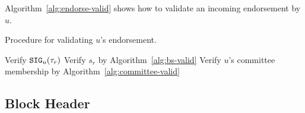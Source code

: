 \documentclass{article}
\begin{document}

Algorithm~\ref{alg:endorse-valid} shows how to validate an incoming endorsement by $u$.

\begin{algorithm}[H]
\caption{Procedure for validating $u$'s endorsement.}
\label{alg:endorse-valid}
\begin{spacing}{1.2}
\begin{algorithmic}[1]
    \vspace{1ex}
    \State Verify ${\tt SIG}_{u}(\tau_r)$
    \State Verify $s_r$ by Algorithm~\ref{alg:bs-valid}
    \State Verify $u$'s committee membership by Algorithm~\ref{alg:committee-valid}
\end{algorithmic}
\end{spacing}
\end{algorithm}

\subsection{Block Header}
\end{document}
